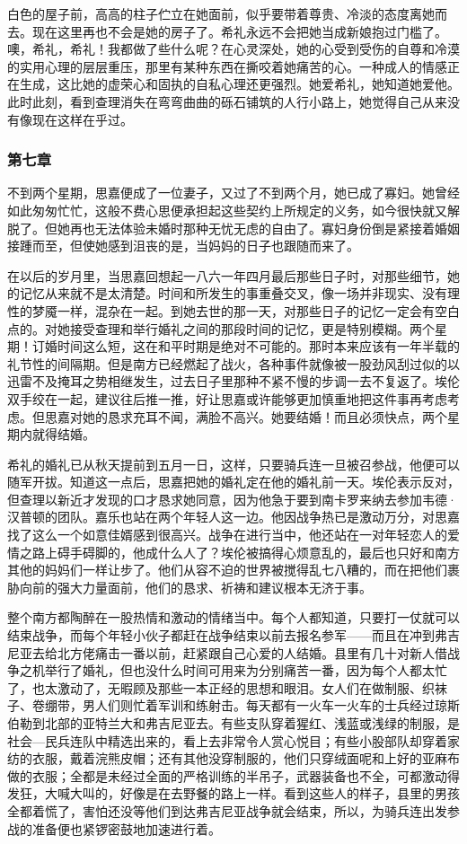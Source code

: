 \par 白色的屋子前，高高的柱子伫立在她面前，似乎要带着尊贵、冷淡的态度离她而去。现在这里再也不会是她的房子了。希礼永远不会把她当成新娘抱过门槛了。噢，希礼，希礼！我都做了些什么呢？在心灵深处，她的心受到受伤的自尊和冷漠的实用心理的层层重压，那里有某种东西在撕咬着她痛苦的心。一种成人的情感正在生成，这比她的虚荣心和固执的自私心理还更强烈。她爱希礼，她知道她爱他。此时此刻，看到查理消失在弯弯曲曲的砾石铺筑的人行小路上，她觉得自己从来没有像现在这样在乎过。


\subsubsection{第七章}


\par 不到两个星期，思嘉便成了一位妻子，又过了不到两个月，她已成了寡妇。她曾经如此匆匆忙忙，这般不费心思便承担起这些契约上所规定的义务，如今很快就又解脱了。但她再也无法体验未婚时那种无忧无虑的自由了。寡妇身份倒是紧接着婚姻接踵而至，但使她感到沮丧的是，当妈妈的日子也跟随而来了。
\par 在以后的岁月里，当思嘉回想起一八六一年四月最后那些日子时，对那些细节，她的记忆从来就不是太清楚。时间和所发生的事重叠交叉，像一场并非现实、没有理性的梦魇一样，混杂在一起。到她去世的那一天，对那些日子的记忆一定会有空白点的。对她接受查理和举行婚礼之间的那段时间的记忆，更是特别模糊。两个星期！订婚时间这么短，这在和平时期是绝对不可能的。那时本来应该有一年半载的礼节性的间隔期。但是南方已经燃起了战火，各种事件就像被一股劲风刮过似的以迅雷不及掩耳之势相继发生，过去日子里那种不紧不慢的步调一去不复返了。埃伦双手绞在一起，建议往后推一推，好让思嘉或许能够更加慎重地把这件事再考虑考虑。但思嘉对她的恳求充耳不闻，满脸不高兴。她要结婚！而且必须快点，两个星期内就得结婚。
\par 希礼的婚礼已从秋天提前到五月一日，这样，只要骑兵连一旦被召参战，他便可以随军开拔。知道这一点后，思嘉把她的婚礼定在他的婚礼前一天。埃伦表示反对，但查理以新近才发现的口才恳求她同意，因为他急于要到南卡罗来纳去参加韦德·汉普顿的团队。嘉乐也站在两个年轻人这一边。他因战争热已是激动万分，对思嘉找了这么一个如意佳婿感到很高兴。战争在进行当中，他还站在一对年轻恋人的爱情之路上碍手碍脚的，他成什么人了？埃伦被搞得心烦意乱的，最后也只好和南方其他的妈妈们一样让步了。他们从容不迫的世界被搅得乱七八糟的，而在把他们裹胁向前的强大力量面前，他们的恳求、祈祷和建议根本无济于事。
\par 整个南方都陶醉在一股热情和激动的情绪当中。每个人都知道，只要打一仗就可以结束战争，而每个年轻小伙子都赶在战争结束以前去报名参军——而且在冲到弗吉尼亚去给北方佬痛击一番以前，赶紧跟自己心爱的人结婚。县里有几十对新人借战争之机举行了婚礼，但也没什么时间可用来为分别痛苦一番，因为每个人都太忙了，也太激动了，无暇顾及那些一本正经的思想和眼泪。女人们在做制服、织袜子、卷绷带，男人们则忙着军训和练射击。每天都有一火车一火车的士兵经过琼斯伯勒到北部的亚特兰大和弗吉尼亚去。有些支队穿着猩红、浅蓝或浅绿的制服，是社会—民兵连队中精选出来的，看上去非常令人赏心悦目；有些小股部队却穿着家纺的衣服，戴着浣熊皮帽；还有其他没穿制服的，他们只穿绒面呢和上好的亚麻布做的衣服；全都是未经过全面的严格训练的半吊子，武器装备也不全，可都激动得发狂，大喊大叫的，好像是在去野餐的路上一样。看到这些人的样子，县里的男孩全都着慌了，害怕还没等他们到达弗吉尼亚战争就会结束，所以，为骑兵连出发参战的准备便也紧锣密鼓地加速进行着。
